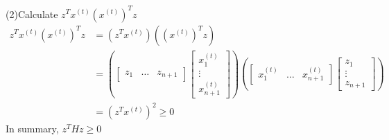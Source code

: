 \documentclass[UTF8]{article}
\begin{document}
(2)Calculate $z^Tx^{(t)}\left(x^{(t)}\right)^Tz$
\begin{align*}
  z^Tx^{(t)}\left(x^{(t)}\right)^Tz
  &= \left(z^Tx^{(t)}\right)\left(\left(x^{(t)}\right)^Tz\right)\\
  &=
  \left(
  \left[\begin{matrix}
    z_1 & \dots & z_{n+1}
  \end{matrix}\right]
    \left[
     \begin{matrix}
      x_1^{(t)} \\
        \vdots \\
        x_{n+1}^{(t)}
     \end{matrix}
    \right]
  \right)
  \left(
  \left[\begin{matrix}
    x_1^{(t)} & \dots & x_{n+1}^{(t)}
  \end{matrix}\right]
    \left[
     \begin{matrix}
      z_1 \\
      \vdots \\
      z_{n+1}
     \end{matrix}
    \right]
  \right) \\
&=\left(z^Tx^{(t)}\right)^2 \geq 0
\end{align*}
In summary, $z^THz \geq 0$
\end{document}

